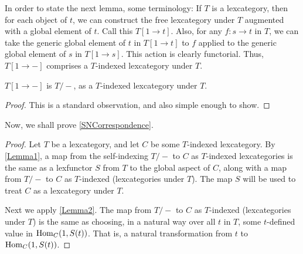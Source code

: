 In order to state the next lemma, some terminology: If $T$ is a lexcategory, then for each object of $t$, we can construct the free lexcategory under $T$ augmented with a global element of $t$. Call this $T[1 \to t]$. Also, for any $f : s \to t$ in $T$, we can take the generic global element of $t$ in $T[1 \to t]$ to $f$ applied to the generic global element of $s$ in $T[1 \to s]$. This action is clearly functorial. Thus, $T[1 \to -]$ comprises a $T$-indexed lexcategory under $T$. 

\begin{lemma}\label{Lemma2}
$T[1 \to -]$ is $T/-$, as a $T$-indexed lexcategory under $T$.
\end{lemma}
\begin{proof}
This is a standard observation, and also simple enough to show. \TODO
\end{proof}

Now, we shall prove \cref{SNCorrespondence}.

\begin{proof}
Let $T$ be a lexcategory, and let $C$ be some $T$-indexed lexcategory. By \cref{Lemma1}, a map from the self-indexing $T/-$ to $C$ as $T$-indexed lexcategories is the same as a lexfunctor $S$ from $T$ to the global aspect of $C$, along with a map from $T/-$ to $C$ as $T$-indexed (lexcategories under $T$). The map $S$ will be used to treat $C$ as a lexcategory under $T$.

Next we apply \cref{Lemma2}. The map from $T/-$ to $C$ as $T$-indexed (lexcategories under $T$) is the same as choosing, in a natural way over all $t$ in $T$, some $t$-defined value in $\operatorname{Hom}_C(1, S(t))$. That is, a natural transformation from $t$ to $\operatorname{Hom}_C(1, S(t))$.
\end{proof}

